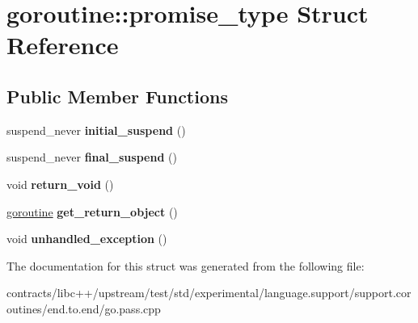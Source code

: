 \hypertarget{structgoroutine_1_1promise__type}{}\section{goroutine\+:\+:promise\+\_\+type Struct Reference}
\label{structgoroutine_1_1promise__type}
\subsection*{Public Member Functions}
\begin{DoxyCompactItemize}
\item 
\mbox{\label{structgoroutine_1_1promise__type_a5b590e62a9d52555271d6d3c0ead90fd}} 
suspend\+\_\+never {\bfseries initial\+\_\+suspend} ()
\item 
\mbox{\label{structgoroutine_1_1promise__type_ab6c47ac3593f87dde6715976af329de2}} 
suspend\+\_\+never {\bfseries final\+\_\+suspend} ()
\item 
\mbox{\label{structgoroutine_1_1promise__type_a79777059c3c7d8f275ee456b0dff4bf8}} 
void {\bfseries return\+\_\+void} ()
\item 
\mbox{\label{structgoroutine_1_1promise__type_aba637b49a2c39171f18e541645f99637}} 
\mbox{\hyperlink{structgoroutine}{goroutine}} {\bfseries get\+\_\+return\+\_\+object} ()
\item 
\mbox{\label{structgoroutine_1_1promise__type_a2ab46fed024fe1350662a6720b7e972b}} 
void {\bfseries unhandled\+\_\+exception} ()
\end{DoxyCompactItemize}


The documentation for this struct was generated from the following file\+:\begin{DoxyCompactItemize}
\item 
contracts/libc++/upstream/test/std/experimental/language.\+support/support.\+coroutines/end.\+to.\+end/go.\+pass.\+cpp\end{DoxyCompactItemize}
